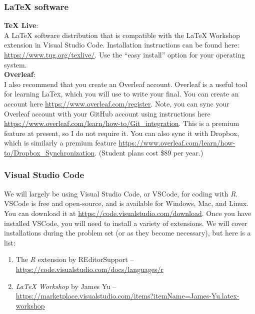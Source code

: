 \documentclass[11pt]{article}
\begin{document}
\vspace{-0.25cm}
\subsubsection*{LaTeX software}
\textbf{TeX Live}: \\
A LaTeX software distribution that is compatible with the LaTeX Workshop extension in Visual Studio Code. Installation instructions can be found here: \url{https://www.tug.org/texlive/}. Use the ``easy install'' option for your operating system. \\

\hspace{-0.25cm} \textbf{Overleaf}: \\
I also recommend that you create an Overleaf account. Overleaf is a useful tool for learning LaTex, which you will use to write your final. You can create an account here \url{https://www.overleaf.com/register}. Note, you can sync your Overleaf account with your GitHub account using instructions here \url{https://www.overleaf.com/learn/how-to/Git_integration}. This is a premium feature at present, so I do not require it. You can also sync it with Dropbox, which is similarly a premium feature \url{https://www.overleaf.com/learn/how-to/Dropbox_Synchronization}. (Student plans cost \$89 per year.)

\vspace{-0.25cm}
\subsubsection*{Visual Studio Code}
We will largely be using Visual Studio Code, or VSCode, for coding with \textit{R}. VSCode is free and open-source, and is available for Windows, Mac, and Linux. You can download it at \url{https://code.visualstudio.com/download}. Once you have installed VSCode, you will need to install a variety of extensions. We will cover installations during the problem set (or as they become necessary), but here is a list:

\begin{enumerate}
  \item The \textit{R} extension by REditorSupport -- \url{https://code.visualstudio.com/docs/languages/r}
  \item \textit{LaTeX Workshop} by James Yu -- \url{https://marketplace.visualstudio.com/items?itemName=James-Yu.latex-workshop}
\end{enumerate}

\vspace{-0.25cm}
\end{document}
